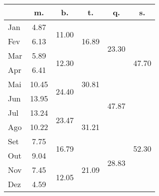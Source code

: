 \begin{center}
\begin{tabular}{| l || c | c | c | c | c |}\hline
 & m. & b. & t. & q. & s. \\\hline
Jan & \multirow{1}{*}{ 4.87 }  & \multirow{2}{*}{ 11.00 }  & \multirow{3}{*}{ 16.89 }  & \multirow{4}{*}{ 23.30 }  & \multirow{6}{*}{ 47.70 }  \\\cline{2-2}
Fev & \multirow{1}{*}{ 6.13 }  & & & & \\\cline{2-2}\cline{3-3}
Mar & \multirow{1}{*}{ 5.89 }  & \multirow{2}{*}{ 12.30 }  & & & \\\cline{2-2}\cline{4-4}
Apr & \multirow{1}{*}{ 6.41 }  & & \multirow{3}{*}{ 30.81 }  & & \\\cline{2-2}\cline{3-3}\cline{5-5}
Mai & \multirow{1}{*}{ 10.45 }  & \multirow{2}{*}{ 24.40 }  & & \multirow{4}{*}{ 47.87 }  & \\\cline{2-2}
Jun & \multirow{1}{*}{ 13.95 }  & & & & \\\cline{2-2}\cline{3-3}\cline{4-4}\cline{6-6}
Jul & \multirow{1}{*}{ 13.24 }  & \multirow{2}{*}{ 23.47 }  & \multirow{3}{*}{ 31.21 }  & & \multirow{6}{*}{ 52.30 }  \\\cline{2-2}
Ago & \multirow{1}{*}{ 10.22 }  & & & & \\\cline{2-2}\cline{3-3}\cline{5-5}
Set & \multirow{1}{*}{ 7.75 }  & \multirow{2}{*}{ 16.79 }  & & \multirow{4}{*}{ 28.83 }  & \\\cline{2-2}\cline{4-4}
Out & \multirow{1}{*}{ 9.04 }  & & \multirow{3}{*}{ 21.09 }  & & \\\cline{2-2}\cline{3-3}
Nov & \multirow{1}{*}{ 7.45 }  & \multirow{2}{*}{ 12.05 }  & & & \\\cline{2-2}
Dez & \multirow{1}{*}{ 4.59 }  & & & & \\\cline{2-2}\cline{3-3}\cline{4-4}\cline{5-5}\cline{6-6}
\hline\end{tabular}
\end{center}